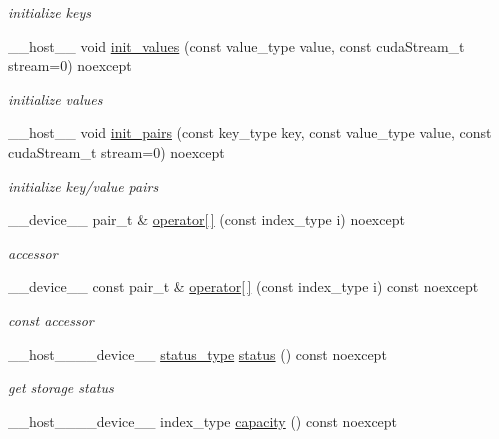 \begin{DoxyCompactItemize}
\begin{DoxyCompactList}\small\item\em initialize keys \end{DoxyCompactList}\item 
\+\_\+\+\_\+host\+\_\+\+\_\+ void \hyperlink{classwarpcore_1_1storage_1_1key__value_1_1AoSStore_ae38e88a4174cb42513ed2e0b0a521ce9}{init\+\_\+values} (const value\+\_\+type value, const cuda\+Stream\+\_\+t stream=0) noexcept
\begin{DoxyCompactList}\small\item\em initialize values \end{DoxyCompactList}\item 
\+\_\+\+\_\+host\+\_\+\+\_\+ void \hyperlink{classwarpcore_1_1storage_1_1key__value_1_1AoSStore_aa4a8c988799409be60ee3368014fc13d}{init\+\_\+pairs} (const key\+\_\+type key, const value\+\_\+type value, const cuda\+Stream\+\_\+t stream=0) noexcept
\begin{DoxyCompactList}\small\item\em initialize key/value pairs \end{DoxyCompactList}\item 
\+\_\+\+\_\+device\+\_\+\+\_\+ pair\+\_\+t \& \hyperlink{classwarpcore_1_1storage_1_1key__value_1_1AoSStore_a786abe7fc9dfef28f1307f32a22fcb82}{operator\mbox{[}$\,$\mbox{]}} (const index\+\_\+type i) noexcept
\begin{DoxyCompactList}\small\item\em accessor \end{DoxyCompactList}\item 
\+\_\+\+\_\+device\+\_\+\+\_\+ const pair\+\_\+t \& \hyperlink{classwarpcore_1_1storage_1_1key__value_1_1AoSStore_abbae46c24d02a8a0bb74322496658d1b}{operator\mbox{[}$\,$\mbox{]}} (const index\+\_\+type i) const noexcept
\begin{DoxyCompactList}\small\item\em const accessor \end{DoxyCompactList}\item 
\+\_\+\+\_\+host\+\_\+\+\_\+\+\_\+\+\_\+device\+\_\+\+\_\+ \hyperlink{classwarpcore_1_1Status}{status\+\_\+type} \hyperlink{classwarpcore_1_1storage_1_1key__value_1_1AoSStore_a040cd6b5abf7ad6b2f20d44d5bae38bf}{status} () const noexcept
\begin{DoxyCompactList}\small\item\em get storage status \end{DoxyCompactList}\item 
\+\_\+\+\_\+host\+\_\+\+\_\+\+\_\+\+\_\+device\+\_\+\+\_\+ index\+\_\+type \hyperlink{classwarpcore_1_1storage_1_1key__value_1_1AoSStore_a23c4cb728f870dfa09a0d0d976cedf8e}{capacity} () const noexcept

\end{DoxyCompactItemize}

